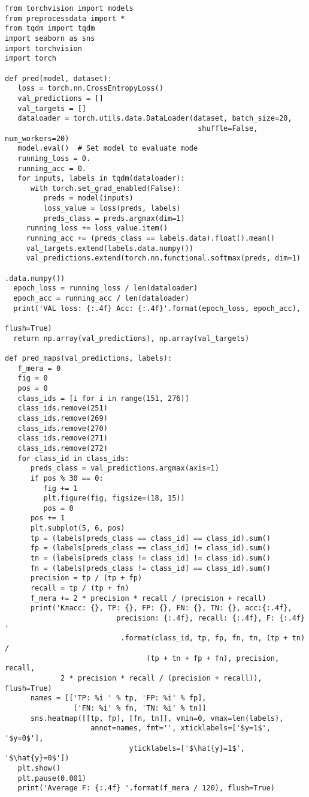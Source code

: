 \small
\begin{verbatim}
from torchvision import models
from preprocessdata import *
from tqdm import tqdm
import seaborn as sns
import torchvision
import torch

def pred(model, dataset):
   loss = torch.nn.CrossEntropyLoss()
   val_predictions = []
   val_targets = []
   dataloader = torch.utils.data.DataLoader(dataset, batch_size=20,
                                             shuffle=False, num_workers=20)
   model.eval()  # Set model to evaluate mode
   running_loss = 0.
   running_acc = 0.
   for inputs, labels in tqdm(dataloader):
      with torch.set_grad_enabled(False):
         preds = model(inputs)
         loss_value = loss(preds, labels)
         preds_class = preds.argmax(dim=1)
     running_loss += loss_value.item()
     running_acc += (preds_class == labels.data).float().mean()
     val_targets.extend(labels.data.numpy())
     val_predictions.extend(torch.nn.functional.softmax(preds, dim=1)
                                                            .data.numpy())
  epoch_loss = running_loss / len(dataloader)
  epoch_acc = running_acc / len(dataloader)
  print('VAL loss: {:.4f} Acc: {:.4f}'.format(epoch_loss, epoch_acc),
                                                               flush=True)
  return np.array(val_predictions), np.array(val_targets)
  
def pred_maps(val_predictions, labels):
   f_mera = 0
   fig = 0
   pos = 0
   class_ids = [i for i in range(151, 276)]
   class_ids.remove(251)
   class_ids.remove(269)
   class_ids.remove(270)
   class_ids.remove(271)
   class_ids.remove(272)
   for class_id in class_ids:
      preds_class = val_predictions.argmax(axis=1)
      if pos % 30 == 0:
         fig += 1
         plt.figure(fig, figsize=(18, 15))
         pos = 0
      pos += 1
      plt.subplot(5, 6, pos)
      tp = (labels[preds_class == class_id] == class_id).sum()
      fp = (labels[preds_class == class_id] != class_id).sum()
      tn = (labels[preds_class != class_id] != class_id).sum()
      fn = (labels[preds_class != class_id] == class_id).sum()
      precision = tp / (tp + fp)
      recall = tp / (tp + fn)
      f_mera += 2 * precision * recall / (precision + recall)
      print('Класс: {}, TP: {}, FP: {}, FN: {}, TN: {}, acc:{:.4f},
                          precision: {:.4f}, recall: {:.4f}, F: {:.4f} '
                           .format(class_id, tp, fp, fn, tn, (tp + tn) /
                                 (tp + tn + fp + fn), precision, recall,
             2 * precision * recall / (precision + recall)), flush=True)
      names = [['TP: %i ' % tp, 'FP: %i' % fp], 
                ['FN: %i' % fn, 'TN: %i' % tn]]
      sns.heatmap([[tp, fp], [fn, tn]], vmin=0, vmax=len(labels),
                    annot=names, fmt='', xticklabels=['$y=1$', '$y=0$'],
                             yticklabels=['$\hat{y}=1$', '$\hat{y}=0$'])
   plt.show()
   plt.pause(0.001)
   print('Average F: {:.4f} '.format(f_mera / 120), flush=True)  


\end{verbatim}

